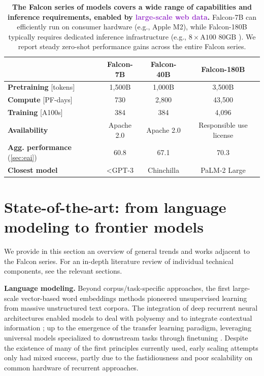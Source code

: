\documentclass{article}
\DeclareRobustCommand{\performance}[1]{\textcolor{JungleGreen}{#1}}
\DeclareRobustCommand{\data}[1]{\textcolor{DarkOrchid}{#1}}
\DeclareRobustCommand{\hardware}[1]{\textcolor{Mahogany}{#1}}
\begin{document}
\begin{table}[b]
\vspace{-0.4in}
\centering
\caption{\textbf{The Falcon series of models covers a wide range of \performance{capabilities} and \hardware{inference requirements}, enabled by \data{large-scale web data}.} Falcon-7B can efficiently run on consumer hardware (e.g., Apple M2), while Falcon-180B typically requires dedicated inference infrastructure (e.g., $8 \times\text{A100 80GB}$ ). We report steady zero-shot performance gains across the entire Falcon series.}
\vspace{0.1in}
\begin{tabular}{@{}lccc@{}}
\toprule
                      & \textbf{Falcon-7B}   & \textbf{Falcon-40B}  & \textbf{Falcon-180B} \\ \midrule
\textbf{Pretraining} {[}tokens{]}   & 1,500B               & 1,000B               & 3,500B               \\
\textbf{Compute} {[}PF-days{]}      & 730                  & 2,800                & 43,500               \\
\textbf{Training} {[}A100s{]} & 384                  & 384                  & 4,096                \\
\textbf{Availability}               & Apache 2.0               & Apache 2.0              & Responsible use license                    \\
\textbf{Agg. performance} (\cref{sec:eai})     & 60.8 & 67.1 & 70.3 \\
\textbf{Closest model}             & <GPT-3                 & Chinchilla           & PaLM-2 Large         \\ \bottomrule
\end{tabular}
\end{table}

\newpage

\tableofcontents

\newpage

\section{State-of-the-art: from language modeling to frontier models}

We provide in this section an overview of general trends and works adjacent to the Falcon series. For an in-depth literature review of individual technical components, see the relevant sections. 

\textbf{Language modeling.} Beyond corpus/task-specific approaches, the first large-scale vector-based word embeddings methods \citep{mikolov2013efficient, pennington2014glove} pioneered unsupervised learning from massive unstructured text corpora. The integration of deep recurrent neural architectures enabled models to deal with polysemy and to integrate contextual information \citep{peters-etal-2018-deep}; up to the emergence of the transfer learning paradigm, leveraging universal models specialized to downstream tasks through finetuning \citep{howard2018universal}. Despite the existence of many of the first principles currently used, early scaling attempts \citep{jozefowicz2016exploring} only had mixed success, partly due to the fastidiousness and poor scalability on common hardware of recurrent approaches.
\end{document}
